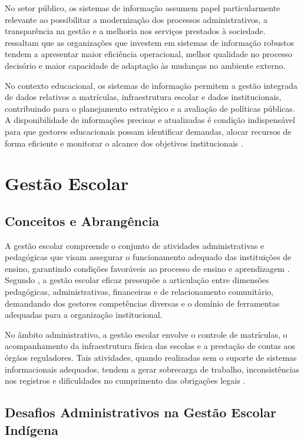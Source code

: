 \documentclass[12pt,a4paper,oneside]{abntspiifac}
\begin{document}
No setor público, os sistemas de informação assumem papel particularmente relevante ao possibilitar a modernização dos processos administrativos, a transparência na gestão e a melhoria nos serviços prestados à sociedade.  ressaltam que as organizações que investem em sistemas de informação robustos tendem a apresentar maior eficiência operacional, melhor qualidade no processo decisório e maior capacidade de adaptação às mudanças no ambiente externo.

No contexto educacional, os sistemas de informação permitem a gestão integrada de dados relativos a matrículas, infraestrutura escolar e dados institucionais, contribuindo para o planejamento estratégico e a avaliação de políticas públicas. A disponibilidade de informações precisas e atualizadas é condição indispensável para que gestores educacionais possam identificar demandas, alocar recursos de forma eficiente e monitorar o alcance dos objetivos institucionais \cite{obrien2013}.

\section{Gestão Escolar}

\subsection{Conceitos e Abrangência}

A gestão escolar compreende o conjunto de atividades administrativas e pedagógicas que visam assegurar o funcionamento adequado das instituições de ensino, garantindo condições favoráveis ao processo de ensino e aprendizagem \cite{libaneofernandes2012}. Segundo , a gestão escolar eficaz pressupõe a articulação entre dimensões pedagógicas, administrativas, financeiras e de relacionamento comunitário, demandando dos gestores competências diversas e o domínio de ferramentas adequadas para a organização institucional.

No âmbito administrativo, a gestão escolar envolve o controle de matrículas, o acompanhamento da infraestrutura física das escolas e a prestação de contas aos órgãos reguladores. Tais atividades, quando realizadas sem o suporte de sistemas informacionais adequados, tendem a gerar sobrecarga de trabalho, inconsistências nos registros e dificuldades no cumprimento das obrigações legais \cite{libaneofernandes2012}.

\subsection{Desafios Administrativos na Gestão Escolar Indígena}
\end{document}
